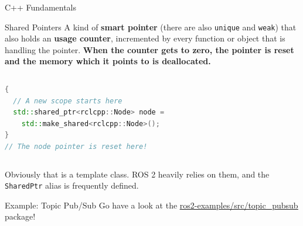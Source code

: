 \begin{frame}[fragile]{C++ Fundamentals}
\begin{block}{Shared Pointers}
A kind of \textbf{smart pointer} (there are also \texttt{unique} and \texttt{weak}) that also holds an \textbf{usage counter}, incremented by every function or object that is handling the pointer. \textbf{When the counter gets to zero, the pointer is reset and the memory which it points to is deallocated.}

\begin{columns}
\begin{lstlisting}[language=C++, caption=Example of shared pointer creation]
{
  // A new scope starts here
  std::shared_ptr<rclcpp::Node> node =
    std::make_shared<rclcpp::Node>();
}
// The node pointer is reset here!
\end{lstlisting}
\end{columns}

Obviously that is a template class. ROS 2 heavily relies on them, and the \texttt{SharedPtr} alias is frequently defined.
\end{block}
\end{frame}

\begin{frame}{Example: Topic Pub/Sub}
Go have a look at the \href{https://github.com/IntelligentSystemsLabUTV/ros2-examples/tree/galactic/src/topic_pubsub}{\color{blue}\underline{ros2-examples/src/topic\_pubsub}} package!
\end{frame}
